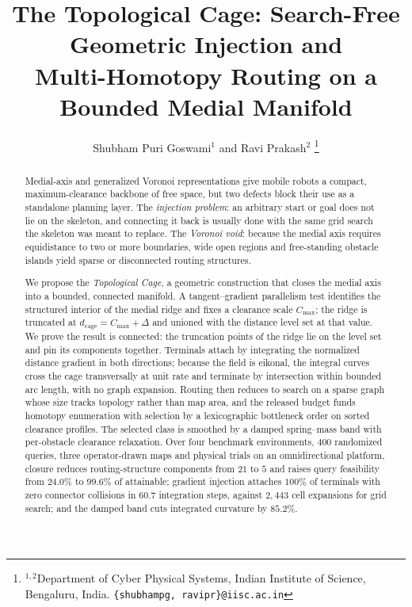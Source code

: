 \documentclass[conference]{IEEEtran}
\begin{document}
\title{\LARGE \bf
The Topological Cage: Search-Free Geometric Injection and \\
Multi-Homotopy Routing on a Bounded Medial Manifold
}

\author{Shubham Puri Goswami$^{1}$ and Ravi Prakash$^{2}$%
\thanks{$^{1,2}$Department of Cyber Physical Systems, Indian Institute of Science, Bengaluru, India. {\tt\small \{shubhampg, ravipr\}@iisc.ac.in}}%
}

\maketitle
\thispagestyle{empty}
\pagestyle{empty}

\begin{abstract}
Medial-axis and generalized Voronoi representations give mobile robots a compact, maximum-clearance backbone of free space, but two defects block their use as a standalone planning layer. The \emph{injection problem}: an arbitrary start or goal does not lie on the skeleton, and connecting it back is usually done with the same grid search the skeleton was meant to replace. The \emph{Voronoi void}: because the medial axis requires equidistance to two or more boundaries, wide open regions and free-standing obstacle islands yield sparse or disconnected routing structures.

We propose the \emph{Topological Cage}, a geometric construction that closes the medial axis into a bounded, connected manifold. A tangent--gradient parallelism test identifies the structured interior of the medial ridge and fixes a clearance scale $C_{\max}$; the ridge is truncated at $d_{\mathrm{cage}}=C_{\max}+\Delta$ and unioned with the distance level set at that value. We prove the result is connected: the truncation points of the ridge lie on the level set and pin its components together. Terminals attach by integrating the normalized distance gradient in both directions; because the field is eikonal, the integral curves cross the cage transversally at unit rate and terminate by intersection within bounded arc length, with no graph expansion. Routing then reduces to search on a sparse graph whose size tracks topology rather than map area, and the released budget funds homotopy enumeration with selection by a lexicographic bottleneck order on sorted clearance profiles. The selected class is smoothed by a damped spring--mass band with per-obstacle clearance relaxation. Over four benchmark environments, $400$ randomized queries, three operator-drawn maps and physical trials on an omnidirectional platform, closure reduces routing-structure components from $21$ to $5$ and raises query feasibility from $24.0\%$ to $99.6\%$ of attainable; gradient injection attaches $100\%$ of terminals with zero connector collisions in $60.7$ integration steps, against $2{,}443$ cell expansions for grid search; and the damped band cuts integrated curvature by $85.2\%$.
\end{abstract}
\end{document}

